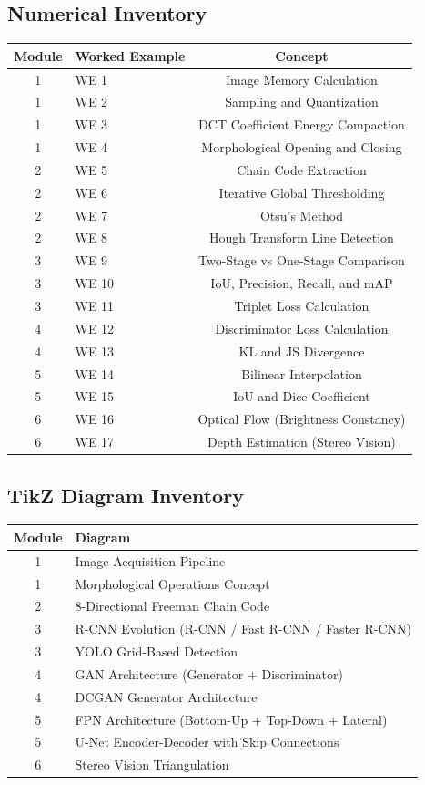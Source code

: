 \documentclass[11pt,a4paper]{article}
\begin{document}
\subsection*{Numerical Inventory}
\begin{center}
\begin{tabular}{|c|l|c|}
\hline
\textbf{Module} & \textbf{Worked Example} & \textbf{Concept} \\
\hline
1 & WE 1 & Image Memory Calculation \\
1 & WE 2 & Sampling and Quantization \\
1 & WE 3 & DCT Coefficient Energy Compaction \\
1 & WE 4 & Morphological Opening and Closing \\
2 & WE 5 & Chain Code Extraction \\
2 & WE 6 & Iterative Global Thresholding \\
2 & WE 7 & Otsu's Method \\
2 & WE 8 & Hough Transform Line Detection \\
3 & WE 9 & Two-Stage vs One-Stage Comparison \\
3 & WE 10 & IoU, Precision, Recall, and mAP \\
3 & WE 11 & Triplet Loss Calculation \\
4 & WE 12 & Discriminator Loss Calculation \\
4 & WE 13 & KL and JS Divergence \\
5 & WE 14 & Bilinear Interpolation \\
5 & WE 15 & IoU and Dice Coefficient \\
6 & WE 16 & Optical Flow (Brightness Constancy) \\
6 & WE 17 & Depth Estimation (Stereo Vision) \\
\hline
\end{tabular}
\end{center}

\subsection*{TikZ Diagram Inventory}
\begin{center}
\begin{tabular}{|c|l|}
\hline
\textbf{Module} & \textbf{Diagram} \\
\hline
1 & Image Acquisition Pipeline \\
1 & Morphological Operations Concept \\
2 & 8-Directional Freeman Chain Code \\
3 & R-CNN Evolution (R-CNN / Fast R-CNN / Faster R-CNN) \\
3 & YOLO Grid-Based Detection \\
4 & GAN Architecture (Generator + Discriminator) \\
4 & DCGAN Generator Architecture \\
5 & FPN Architecture (Bottom-Up + Top-Down + Lateral) \\
5 & U-Net Encoder-Decoder with Skip Connections \\
6 & Stereo Vision Triangulation \\
\hline
\end{tabular}
\end{center}
\end{document}
